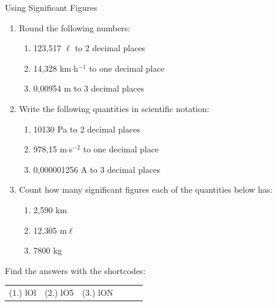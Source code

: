 \begin{exercises}{Using Significant Figures }
            \nopagebreak
        \label{m30853*id64958}\begin{enumerate}[noitemsep, label=\textbf{\arabic*}. ] 
            \label{m30853*uid20}\item Round the following numbers:
\label{m30853*id64973}\begin{enumerate}[noitemsep, label=\textbf{\alph*}. ] 
            \label{m30853*uid21}\item 123,517 $\ell $ to 2 decimal places
\label{m30853*uid22}\item 14,328 km$\ensuremath{\cdot}$h${}^{-1}$ to one decimal place
\label{m30853*uid23}\item 0,00954 m to 3 decimal places
\end{enumerate}
                \label{m30853*uid24}\item Write the following quantities in scientific notation:
\label{m30853*id65060}\begin{enumerate}[noitemsep, label=\textbf{\alph*}. ] 
            \label{m30853*uid25}\item 10130 Pa to 2 decimal places
\label{m30853*uid26}\item 978,15 m$\ensuremath{\cdot}$s${}^{-2}$ to one decimal place
\label{m30853*uid27}\item 0,000001256 A to 3 decimal places
\end{enumerate}
                \label{m30853*uid28}\item Count how many significant figures each of the quantities below has:
\label{m30853*id65139}\begin{enumerate}[noitemsep, label=\textbf{\alph*}. ] 
            \label{m30853*uid29}\item 2,590 km
\label{m30853*uid30}\item 12,305 m$\ell $\label{m30853*uid31}\item 7800 kg
\end{enumerate}
                \end{enumerate}
\par {} Find the answers with the shortcodes:
 \par \begin{tabular}[h]{cccccc}
 (1.) lOl  &  (2.) lO5  &  (3.) lON  & \end{tabular}
\end{exercises}
